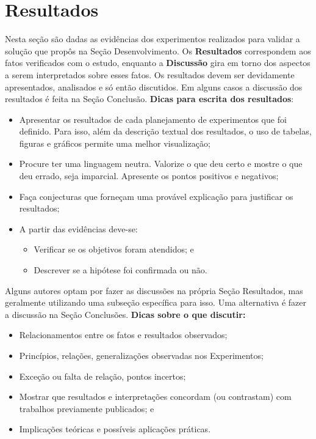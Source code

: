 \section{Resultados}
\label{resultados}

Nesta seção são dadas as evidências dos experimentos realizados para validar a solução que propôs na Seção Desenvolvimento. Os \textbf{Resultados} correspondem aos fatos verificados com o estudo, enquanto a \textbf{Discussão} gira em torno dos aspectos a serem interpretados sobre esses fatos. Os resultados devem ser devidamente apresentados, analisados e só então discutidos. Em alguns casos a discussão dos resultados é feita na Seção Conclusão. \textbf{Dicas para escrita dos resultados}:

\vspace{-0.2cm}
\noindent
\begin{itemize}
    \item Apresentar os resultados de cada planejamento de experimentos que foi definido. Para isso, além da descrição textual dos resultados, o uso de tabelas, figuras e gráficos permite uma melhor visualização;
    
    \item Procure ter uma linguagem neutra. Valorize o que deu certo e mostre o que deu errado, seja imparcial. Apresente os pontos positivos e negativos;
    
    \item Faça conjecturas que forneçam uma provável explicação para justificar os resultados;
    
    \item A partir das evidências deve-se:
    \begin{itemize}
        \item[\tiny$\blacksquare$] Verificar se os objetivos foram atendidos; e
	    \item[\tiny$\blacksquare$] Descrever se a hipótese foi confirmada ou não.
    \end{itemize}
\end{itemize}

Alguns autores optam por fazer as discussões na própria Seção Resultados, mas geralmente utilizando uma subseção específica para isso. Uma alternativa é fazer a discussão na Seção Conclusões. \textbf{Dicas sobre o que discutir:}

\vspace{-0.2cm}
\begin{itemize}
    \item Relacionamentos entre os fatos e resultados observados;
    \item Princípios, relações, generalizações observadas nos Experimentos;
    \item Exceção ou falta de relação, pontos incertos;
    \item Mostrar que resultados e interpretações concordam (ou contrastam) com trabalhos previamente publicados; e
    \item Implicações teóricas e possíveis aplicações práticas.
\end{itemize}

